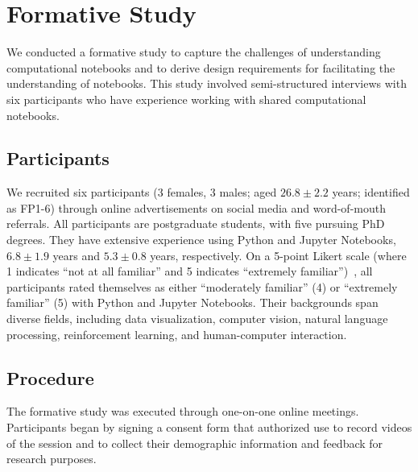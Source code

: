 


\section{Formative Study} \label{sec: formative study}

We conducted a formative study to capture the challenges of understanding computational notebooks and to derive design requirements for facilitating the understanding of notebooks. 
This study involved semi-structured interviews with six participants who have experience working with shared computational notebooks.




\subsection{Participants}
We recruited six participants (3 females, 3 males; aged $26.8\pm2.2$ years; identified as FP1-6) through online advertisements on social media and word-of-mouth referrals.
All participants are postgraduate students, with five pursuing PhD degrees. 
They have extensive experience using Python and Jupyter Notebooks,  $6.8\pm1.9$ years and $5.3\pm0.8$ years, respectively. 
On a 5-point Likert scale (where 1 indicates ``not at all familiar'' and 5 indicates ``extremely familiar'')~\cite{likert}, all participants rated themselves as either ``moderately familiar'' (4) or ``extremely familiar'' (5) with Python and Jupyter Notebooks. 
Their backgrounds span diverse fields, including data visualization, computer vision, natural language processing, reinforcement learning, and human-computer interaction.




\subsection{Procedure}

The formative study was executed through one-on-one online meetings. 
Participants began by signing a consent form that authorized use to record videos of the session and to collect their demographic information and feedback for research purposes.

